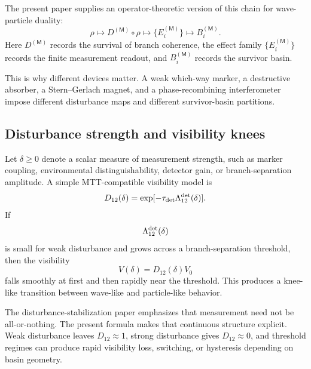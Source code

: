 \documentclass[11pt]{article}
\newcommand{\Meas}{\mathsf M}
\begin{document}
The present paper supplies an operator-theoretic version of this chain for wave-particle
duality:
\begin{equation}
  \rho
  \longmapsto
  D^{(\Meas)}\circ\rho
  \longmapsto
  \{E_i^{(\Meas)}\}
  \longmapsto
  B_i^{(\Meas)}.
  \label{eq:operator-disturbance-chain}
\end{equation}
Here \(D^{(\Meas)}\) records the survival of branch coherence, the effect family
\(\{E_i^{(\Meas)}\}\) records the finite measurement readout, and \(B_i^{(\Meas)}\) records the
survivor basin.

This is why different devices matter. A weak which-way marker, a destructive absorber, a
Stern--Gerlach magnet, and a phase-recombining interferometer impose different disturbance
maps and different survivor-basin partitions.

\subsection{Disturbance strength and visibility knees}
\label{subsec:disturbance-strength-knees}

Let \(\delta\ge0\) denote a scalar measure of measurement strength, such as marker coupling,
environmental distinguishability, detector gain, or branch-separation amplitude. A simple
MTT-compatible visibility model is
\begin{equation}
  D_{12}(\delta)
  =
  \exp[-\tau_{\rm det}\Lambda_{12}^{\rm det}(\delta)].
  \label{eq:visibility-delta-model}
\end{equation}
If
\begin{equation}
  \Lambda_{12}^{\rm det}(\delta)
\end{equation}
is small for weak disturbance and grows across a branch-separation threshold, then the
visibility
\begin{equation}
  V(\delta)
  =
  D_{12}(\delta)V_0
\end{equation}
falls smoothly at first and then rapidly near the threshold. This produces a knee-like
transition between wave-like and particle-like behavior.

\begin{remark}
\label{rem:weak-strong-threshold}
The disturbance-stabilization paper emphasizes that measurement need not be all-or-nothing.
The present formula makes that continuous structure explicit. Weak disturbance leaves
\(D_{12}\approx1\), strong disturbance gives \(D_{12}\approx0\), and threshold regimes can
produce rapid visibility loss, switching, or hysteresis depending on basin geometry.
\end{remark}
\end{document}
